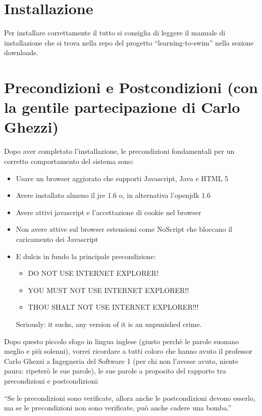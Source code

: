 \documentclass[a4paper,12pt]{article}
\begin{document}
	    \vspace*{\fill}
	\tableofcontents
	    \vspace*{\fill}

\clearpage

\section{Installazione}
Per installare correttamente il tutto si consiglia di leggere il manuale di installazione che si trova nella repo del progetto ``learning-to-swim'' nella sezione downloads.

\section{Precondizioni e Postcondizioni (con la gentile partecipazione di Carlo Ghezzi)}
Dopo aver completato l'installazione, le precondizioni fondamentali per un corretto comportamento del sistema sono:

\begin{itemize}
 \item Usare un browser aggiorato che supporti Javascript, Java e HTML 5
 \item Avere installato almeno il jre 1.6 o, in alternativa l'openjdk 1.6
 \item Avere attivi javascript e l'accettazione di cookie nel browser
 \item Non avere attive sul browser estensioni come NoScript che bloccano il caricamento dei Javascript
 \item E dulcis in fundo la principale precondizione:
 \begin{itemize}
  \item DO NOT USE INTERNET EXPLORER!
  \item YOU MUST NOT USE INTERNET EXPLORER!!
  \item THOU SHALT NOT USE INTERNET EXPLORER!!!
 \end{itemize}
 Seriously: it sucks, any version of it is an unpunished crime.
\end{itemize}
Dopo questo piccolo sfogo in lingua inglese (giusto perchè le parole suonano meglio e più solenni), vorrei ricordare a tutti coloro che hanno avuto il professor Carlo Ghezzi a Ingegneria del Software 1 (per chi non l'avesse avuto, niente paura: ripeterò le
sue parole), le sue parole a proposito del rapporto tra precondizioni e postcondizioni: \linebreak

``Se le precondizioni sono verificate, allora anche le postcondizioni devono esserlo, ma se le precondizioni non sono verificate, può anche cadere una bomba.'' 
\linebreak
\end{document}
